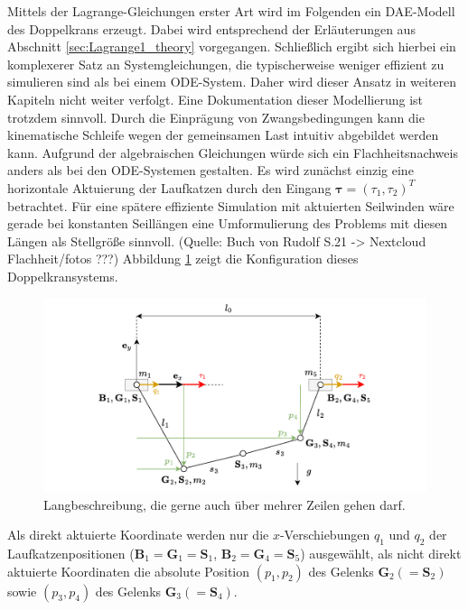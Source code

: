 Mittels der Lagrange-Gleichungen erster Art wird im Folgenden ein DAE-Modell des Doppelkrans erzeugt. Dabei wird entsprechend der Erläuterungen aus Abschnitt \ref{sec:Lagrange1_theory} vorgegangen. Schließlich ergibt sich hierbei ein komplexerer Satz an Systemgleichungen, die typischerweise weniger effizient zu simulieren sind als bei einem ODE-System. Daher wird dieser Ansatz in weiteren Kapiteln nicht weiter verfolgt. Eine Dokumentation dieser Modellierung ist trotzdem sinnvoll. Durch die Einprägung von Zwangsbedingungen kann die kinematische Schleife wegen der gemeinsamen Last intuitiv abgebildet werden kann. Aufgrund der algebraischen Gleichungen würde sich ein Flachheitsnachweis anders als bei den ODE-Systemen gestalten. Es wird zunächst einzig eine horizontale Aktuierung der Laufkatzen durch den Eingang $\boldsymbol{\tau} = (\tau_{1}, \tau_{2})^T$ betrachtet. Für eine spätere effiziente Simulation mit aktuierten Seilwinden wäre gerade bei konstanten Seillängen eine Umformulierung des Problems mit diesen Längen als Stellgröße sinnvoll. (Quelle: Buch von Rudolf S.21 -> Nextcloud Flachheit/fotos ???) Abbildung \ref{fig:DAE_double_crane_diagram} zeigt die Konfiguration dieses Doppelkransystems.

\begin{figure}[ht]
	\begin{center}
		\includegraphics[scale=1]{Pictures/DAE_double_crane_cartesian_diagram.pdf}
	\end{center}
	\caption[Kurzbeschreibung für Abbildungsverzeichnis]
	{Langbeschreibung, die gerne auch über mehrer Zeilen gehen darf.}
	\label{fig:DAE_double_crane_diagram}
\end{figure}

Als direkt aktuierte Koordinate werden nur die $x$-Verschiebungen $q_1$ und $q_2$ der Laufkatzenpositionen ($\mathbf{B}_1 = \mathbf{G}_1 = \mathbf{S}_1$, $\mathbf{B}_2 = \mathbf{G}_4 = \mathbf{S}_5$) ausgewählt, als nicht direkt aktuierte Koordinaten die absolute Position $(p_1, p_2)$ des Gelenks $\mathbf{G}_2 (= \mathbf{S}_2)$ sowie $(p_3, p_4)$ des Gelenks $\mathbf{G}_3 (=\mathbf{S}_4)$. 

